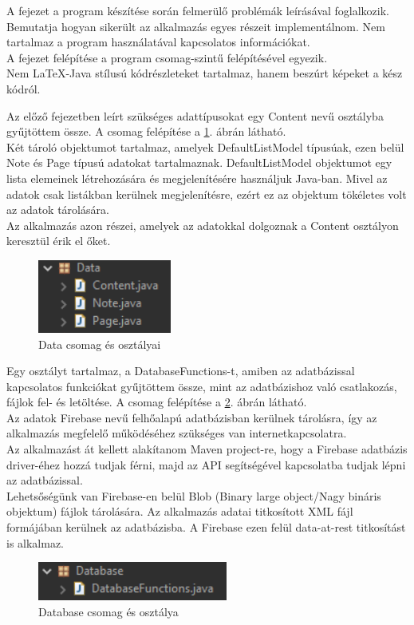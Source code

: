 A fejezet a program készítése során felmerülő problémák leírásával foglalkozik. Bemutatja hogyan sikerült az alkalmazás egyes részeit implementálnom. Nem tartalmaz a program használatával kapcsolatos információkat. 
\\A fejezet felépítése a program csomag-szintű felépítésével egyezik.
\\Nem LaTeX-Java stílusú kódrészleteket tartalmaz, hanem beszúrt képeket a kész kódról.

Az előző fejezetben leírt szükséges adattípusokat egy Content nevű osztályba gyűjtöttem össze. A csomag felépítése a \ref{fig:package_data}. ábrán látható.
\vspace{5pt}\\Két tároló objektumot tartalmaz, amelyek DefaultListModel típusúak, ezen belül Note és Page típusú adatokat tartalmaznak. DefaultListModel objektumot egy lista elemeinek létrehozására és megjelenítésére használjuk Java-ban. Mivel az adatok csak listákban kerülnek megjelenítésre, ezért ez az objektum tökéletes volt az adatok tárolására.
\vspace{5pt}\\Az alkalmazás azon részei, amelyek az adatokkal dolgoznak a Content osztályon keresztül érik el őket.
\begin{figure}[h]
	\centering
	\includegraphics[scale=0.7]{images/package_data.png}
	\caption{Data csomag és osztályai}
	\label{fig:package_data}
\end{figure}

Egy osztályt tartalmaz, a DatabaseFunctions-t, amiben az adatbázissal kapcsolatos funkciókat gyűjtöttem össze, mint az adatbázishoz való csatlakozás, fájlok fel- és letöltése. A csomag felépítése a \ref{fig:package_database}. ábrán látható.
\vspace{5pt}\\Az adatok Firebase nevű felhőalapú adatbázisban kerülnek tárolásra, így az alkalmazás megfelelő működéséhez szükséges van internetkapcsolatra.
\\Az alkalmazást át kellett alakítanom Maven project-re, hogy a Firebase adatbázis driver-éhez hozzá tudjak férni, majd az API segítségével kapcsolatba tudjak lépni az adatbázissal.
\\Lehetsőségünk van Firebase-en belül Blob (Binary large object/Nagy bináris objektum) fájlok tárolására. Az alkalmazás adatai titkosított XML fájl formájában kerülnek az adatbázisba. A Firebase ezen felül data-at-rest titkosítást is alkalmaz.
\begin{figure}[h]
	\centering
	\includegraphics[scale=0.7]{images/package_database.png}
	\caption{Database csomag és osztálya}
	\label{fig:package_database}
\end{figure}

